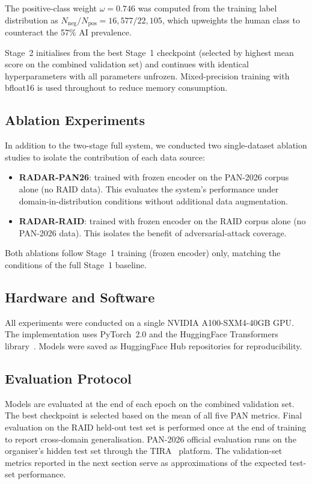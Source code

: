The positive-class weight $\omega = 0.746$ was computed from the training label distribution as $N_{\text{neg}} / N_{\text{pos}} = 16{,}577 / 22{,}105$, which upweights the human class to counteract the 57\% AI prevalence.

Stage~2 initialises from the best Stage~1 checkpoint (selected by highest mean score on the combined validation set) and continues with identical hyperparameters with all parameters unfrozen. Mixed-precision training with bfloat16 is used throughout to reduce memory consumption.

\subsection{Ablation Experiments}

In addition to the two-stage full system, we conducted two single-dataset ablation studies to isolate the contribution of each data source:

\begin{itemize}
  \item \textbf{RADAR-PAN26}: trained with frozen encoder on the PAN-2026 corpus alone (no RAID data). This evaluates the system's performance under domain-in-distribution conditions without additional data augmentation.
  \item \textbf{RADAR-RAID}: trained with frozen encoder on the RAID corpus alone (no PAN-2026 data). This isolates the benefit of adversarial-attack coverage.
\end{itemize}

Both ablations follow Stage~1 training (frozen encoder) only, matching the conditions of the full Stage~1 baseline.

\subsection{Hardware and Software}

All experiments were conducted on a single NVIDIA A100-SXM4-40GB GPU. The implementation uses PyTorch~2.0 and the HuggingFace Transformers library~\cite{wolf:2020}. Models were saved as HuggingFace Hub repositories for reproducibility.

\subsection{Evaluation Protocol}

Models are evaluated at the end of each epoch on the combined validation set. The best checkpoint is selected based on the mean of all five PAN metrics. Final evaluation on the RAID held-out test set is performed once at the end of training to report cross-domain generalisation. PAN-2026 official evaluation runs on the organiser's hidden test set through the TIRA~\cite{froebe:2023b} platform. The validation-set metrics reported in the next section serve as approximations of the expected test-set performance.
